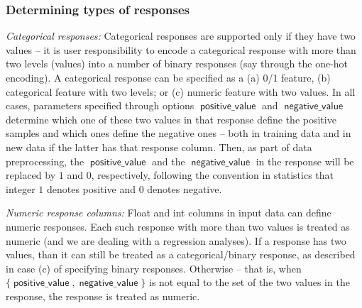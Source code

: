 \documentclass[a4paper,parskip=half]{article} %
\newcommand*\option[1]{\operatorname{\mathsf{#1}}} %
\newcommand{\delete}[1]{}
\begin{document}
\subsubsection{Determining types of responses}

\noindent \emph{Categorical responses:} 
Categorical responses are supported only if they have two values -- it is user 
responsibility to encode a categorical response with more than two levels (values) into
a number of binary responses (say through the one-hot encoding). 
A categorical response can be specified as a (a) 0/1 feature, (b) categorical feature with 
two levels; or (c) numeric feature with two values. In all cases, parameters specified through
options $\option{positive\_value}$ and $\option{negative\_value}$ determine which one of 
these two values in that response define the positive samples and which ones define the 
negative ones -- both in training data and in new data if the latter has that response column. 
Then, as part of data preprocessing, the  $\option{positive\_value}$ and the $\option{negative\_value}$ 
in the response will be replaced by $1$ and $0$, respectively, following the convention in statistics that 
integer $1$ denotes positive and $0$ denotes negative. 
\delete{
That is, the intention is that user has to provide categorical responses as $1/0$ responses
where $1$ denotes positive samples and $0$ denotes negative samples, and to make the tool user
friendly the user has freedom to specify categorical responses in one of the three ways (a)-(c)
described above with the intention that the tool internally will convert such responses into
$1/0$ columns and all the results will be reported and visualized using $1/0$ values and not the
original values used to define positive and negative values in the responses in the raw input data.
}

\noindent \emph{Numeric response columns:} 
Float and int columns in input data can define numeric responses. Each such response with more than 
two values is treated as numeric (and we are dealing with a regression analyses). If a response has 
two values, than it can still be treated as a categorical/binary response, as described in case (c) of specifying
binary responses. Otherwise -- that is, when $\{\option{positive\_value}, \option{negative\_value}\}$ is not
equal to the set of the two values in the response, the response is treated as numeric. 
\delete{
Parameter values specified through options $positive\_value$ and $negative\_value$ have a different 
meaning for numeric responses: they are not used to replace values in the response as part of 
preprocessing. Instead, $positive\_value = STAT\_POSITIVE\_VALUE$ and $negative\_value = STAT\_NEGATIVE\_VALUE$
(which is the default) specifies that the high values in the response are positive (undesirable) and
the low values are negative (desirable). The opposite assignment $positive\_value$ = $STAT\_NEGATIVE\_VALUE$ 
and $negative\_value = STAT\_POSITIVE\_VALUE$ specifies that low values in the response are positive and
high values are negative. Other possibilities for the pair $(positive\_value, negative\_value)$ are 
considered as incorrect specification and an error message is issued. 
}
\end{document}

